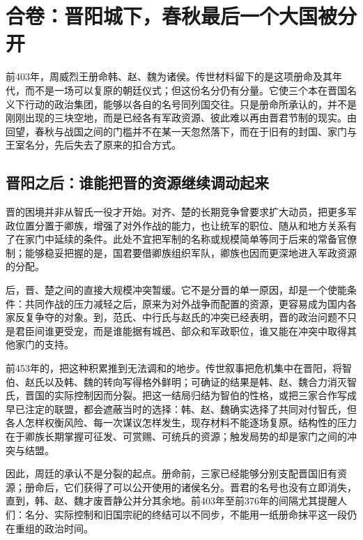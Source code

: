 \section{合卷：晋阳城下，春秋最后一个大国被分开}

前403年，周威烈王册命韩、赵、魏为诸侯。传世材料留下的是这项册命及其年代，而不是一场可以复原的朝廷仪式；但这份名分仍有分量。它使三个本在晋国名义下行动的政治集团，能够以各自的名号同列国交往。只是册命所承认的，并不是刚刚出现的三块空地，而是已经各有军政资源、彼此难以再由晋君节制的现实。由回望，春秋与战国之间的门槛并不在某一天忽然落下，而在于旧有的封国、家门与王室名分，先后失去了原来的扣合方式。

\subsection{晋阳之后：谁能把晋的资源继续调动起来}

晋的困境并非从智氏一役才开始。对齐、楚的长期竞争曾要求扩大动员，把更多军政位置分置于卿族，增强了对外作战的能力，也让统军的职位、随从和地方关系有了在家门中延续的条件。此处不宜把军制的名称或规模简单等同于后来的常备官僚制；能够稳妥把握的是，国君要借卿族组织军队，卿族也因而更深地进入军政资源的分配。

后，晋、楚之间的直接大规模冲突暂缓。它不是分晋的单一原因，却是一个使能条件：共同作战的压力减轻之后，原来为对外战争而配置的资源，更容易成为国内各家反复争夺的对象。到，范氏、中行氏与赵氏的冲突已经表明，晋的政治问题不只是君臣间谁更受宠，而是谁能据有城邑、部众和军政职位，谁又能在冲突中取得其他家门的支持。

前453年的，把这种积累推到无法调和的地步。传世叙事把危机集中在晋阳，将智伯、赵氏以及韩、魏的转向写得格外鲜明；可确证的结果是韩、赵、魏合力消灭智氏，晋国的实际控制因而分裂。把这一结局归结为智伯的性格，或把三家合作写成早已注定的联盟，都会遮蔽当时的选择：韩、赵、魏确实选择了共同对付智氏，但各人怎样权衡风险、每一次谋议怎样发生，现存材料不能逐场复原。结构性的压力在于卿族长期掌握可征发、可赏赐、可统兵的资源；触发局势的却是家门之间的冲突与结盟。

因此，周廷的承认不是分裂的起点。册命前，三家已经能够分别支配晋国旧有资源；册命后，它们获得了可以公开使用的诸侯名分。晋君的名号也没有立即消失，直到，韩、赵、魏才废晋静公并分其余地。前403年至前376年的间隔尤其提醒人们：名分、实际控制和旧国宗祀的终结可以不同步，不能用一纸册命抹平这一段仍在重组的政治时间。

